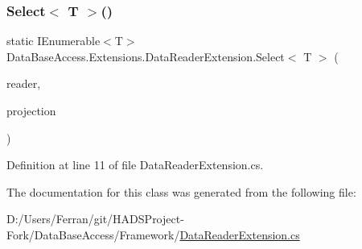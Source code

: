 \subsubsection{\texorpdfstring{Select$<$ T $>$()}{Select< T >()}}
{\footnotesize\ttfamily static I\+Enumerable$<$T$>$ Data\+Base\+Access.\+Extensions.\+Data\+Reader\+Extension.\+Select$<$ T $>$ (\begin{DoxyParamCaption}\item[{this I\+Data\+Reader}]{reader,  }\item[{Func$<$ I\+Data\+Reader, T $>$}]{projection }\end{DoxyParamCaption})\hspace{0.3cm}{\ttfamily [static]}}



Definition at line 11 of file Data\+Reader\+Extension.\+cs.



The documentation for this class was generated from the following file\+:\begin{DoxyCompactItemize}
\item 
D\+:/\+Users/\+Ferran/git/\+H\+A\+D\+S\+Project-\/\+Fork/\+Data\+Base\+Access/\+Framework/\mbox{\hyperlink{DataReaderExtension_8cs}{Data\+Reader\+Extension.\+cs}}\end{DoxyCompactItemize}
